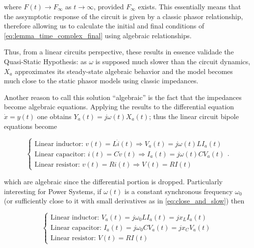 	\noindent where $F(t)\to F_\infty$ as $t\to\infty$, provided $F_\infty$ exists. This essentially means that the assymptotic response of the circuit is given by a classic phasor relationship, therefore allowing us to calculate the initial and final conditions of \eqref{eq:lemma_time_complex_final} using algebraic relationships.

	Thus, from a linear circuits perspective, these results in essence validade the Quasi-Static Hypothesis: as $\omega$ is supposed much slower than the circuit dynamics, $X_a$ approximates its steady-state algebraic behavior and the model becomes much close to the static phasor models using classic impedances.

	Another reason to call this solution ``algebraic'' is the fact that the impedances become algebraic equations. Applying the results to the differential equation $\dot{x} = y(t)$ one obtains $Y_a(t) = j\omega(t)X_a(t)$; thus the linear circuit bipole equations become

\begin{equation} \left\{\begin{array}{l} \text{Linear inductor: } v(t) = L \dot{i}(t) \Rightarrow V_a(t) = j\omega(t) L I_a(t) \\[3mm] \text{Linear capacitor: } i(t) = C \dot{v}(t) \Rightarrow I_a(t) = j\omega(t) C V_a(t) \\[3mm] \text{Linear resistor: } v(t) = Ri(t) \Rightarrow V(t) = RI(t) \end{array}\right. \label{eq:Linear_approximated_relationshipsp} .\end{equation}

	\noindent which are algebraic since the differential portion is dropped. Particularly interesting for Power Systems, if $\omega(t)$ is a constant synchronous frequency $\omega_0$ (or sufficiently close to it with small derivatives as in \eqref{eq:close_and_slow}) then

\begin{equation} \left\{\begin{array}{l} \text{Linear inductor: } V_a(t) = j\omega_0L I_a(t) = j x_L I_a(t) \\[3mm] \text{Linear capacitor: } I_a(t) = j\omega_0 C V_a(t) = j x_C V_a(t) \\[3mm] \text{Linear resistor: } V(t) = RI(t) \end{array}\right. \label{eq:Linear_approximated_relationships_synch} \end{equation}


